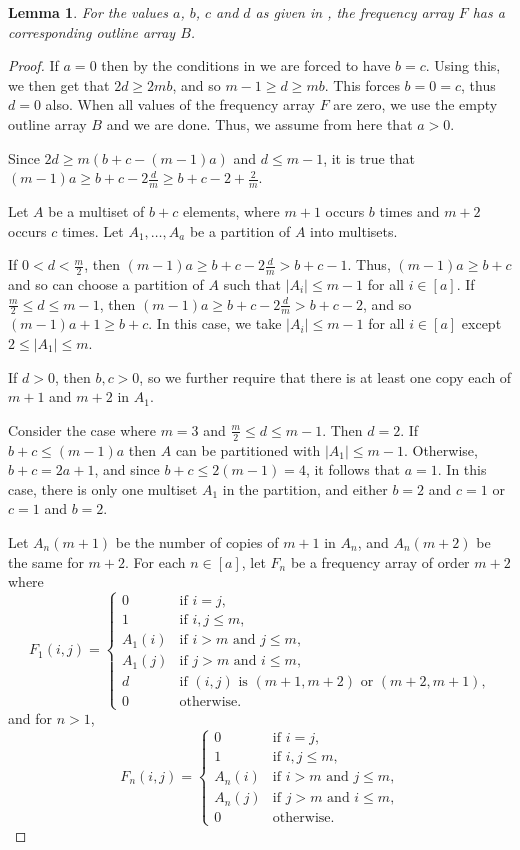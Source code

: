 \documentclass[preprint,nonatbib]{elsarticle}
\newtheorem{lemma}[theorem]{Lemma}
\theoremstyle{definition}
\numberwithin{equation}{section}
\begin{document}
\begin{lemma}
\label{lemma: fill L (a^mbc)}
    For the values $a$, $b$, $c$ and $d$ as given in , the frequency array $F$ has a corresponding outline array $B$.
\end{lemma}
\begin{proof}
    If $a=0$ then by the conditions in  we are forced to have $b=c$. Using this, we then get that $2d\geq 2mb$, and so $m-1\geq d\geq mb$. This forces $b=0=c$, thus $d=0$ also. When all values of the frequency array $F$ are zero, we use the empty outline array $B$ and we are done. Thus, we assume from here that $a>0$.

    Since $2d\geq m(b+c - (m-1)a)$ and $d\leq m-1$, it is true that $(m-1)a \geq b+c - 2\frac{d}{m}\geq b+c - 2 + \frac{2}{m}$. 
    
    Let $A$ be a multiset of $b+c$ elements, where $m+1$ occurs $b$ times and $m+2$ occurs $c$ times. Let $A_1,\dots,A_a$ be a partition of $A$ into multisets.

    If $0<d<\frac{m}{2}$, then $(m-1)a\geq b+c-2\frac{d}{m}>b+c-1$. Thus, $(m-1)a\geq b+c$ and so can choose a partition of $A$ such that $|A_i|\leq m-1$ for all $i\in[a]$. If $\frac{m}{2}\leq d\leq m-1$, then $(m-1)a\geq b+c-2\frac{d}{m}>b+c-2$, and so $(m-1)a+1\geq b+c$. In this case, we  take $|A_i|\leq m-1$ for all $i\in[a]$ except $2\leq |A_1|\leq m$.

    If $d>0$, then $b,c>0$, so we further require that there is at least one copy each of $m+1$ and $m+2$ in $A_1$.

    Consider the case where $m=3$ and $\frac{m}{2}\leq d\leq m-1$. Then $d=2$. If $b+c \leq (m-1)a$ then $A$ can be partitioned with $|A_1|\leq m-1$. Otherwise, $b+c = 2a+1$, and since $b+c\leq 2(m-1) = 4$, it follows that $a=1$. In this case, there is only one multiset $A_1$ in the partition, and either $b=2$ and $c=1$ or $c=1$ and $b=2$.

    Let $A_n(m+1)$ be the number of copies of $m+1$ in $A_n$, and $A_n(m+2)$ be the same for $m+2$. For each $n\in[a]$, let $F_n$ be a frequency array of order $m+2$ where
    $$F_1(i,j) = \begin{cases}
        0 & \text{if $i=j$,}\\
        1 & \text{if $i,j\leq m$,}\\
        A_1(i) & \text{if $i>m$ and $j\leq m$,}\\
        A_1(j) & \text{if $j>m$ and $i\leq m$,}\\
        d & \text{if $(i,j)$ is $(m+1,m+2)$ or $(m+2,m+1)$,}\\
        0 & \text{otherwise.}
    \end{cases}$$
    and for $n>1$,
    $$F_n(i,j) = \begin{cases}
        0 & \text{if $i=j$,}\\
        1 & \text{if $i,j\leq m$,}\\
        A_n(i) & \text{if $i>m$ and $j\leq m$,}\\
        A_n(j) & \text{if $j>m$ and $i\leq m$,}\\
        0 & \text{otherwise.}
    \end{cases}$$


\end{proof}
\end{document}
